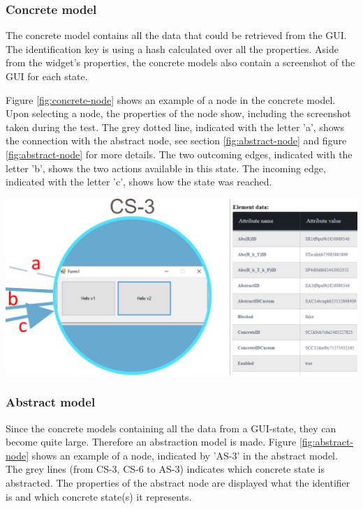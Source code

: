 \subsubsection{Concrete model}
The concrete model contains all the data that could be retrieved from the GUI. The identification key is using a hash calculated over all the properties. Aside from the widget's properties, the concrete models also contain a screenshot of the GUI for each state.

Figure \ref{fig:concrete-node} shows an example of a node in the concrete model. Upon selecting a node, the properties of the node show, including the screenshot taken during the test. The grey dotted line, indicated with the letter 'a', shows the connection with the abstract node, see section \ref{fig:abstract-node} and figure \ref{fig:abstract-node} for more details. The two outcoming edges, indicated with the letter 'b', shows the two actions available in this state. The incoming edge, indicated with the letter 'c', shows how the state was reached. 

\bigskip
\begingroup
\captionsetup{type=figure}
\includegraphics[scale=0.5]{pics/concrete-model.png}
\label{fig:concrete-node}
\endgroup

\subsubsection{Abstract model} \label{abstract-node}
Since the concrete models containing all the data from a GUI-state, they can become quite large.  Therefore an abstraction model is made. Figure \ref{fig:abstract-node} shows an example of a node, indicated by 'AS-3'  in the abstract model. The grey lines (from CS-3, CS-6 to AS-3) indicates which concrete state is abstracted. The properties of the abstract node are displayed what the identifier is and which concrete state(s) it represents.

